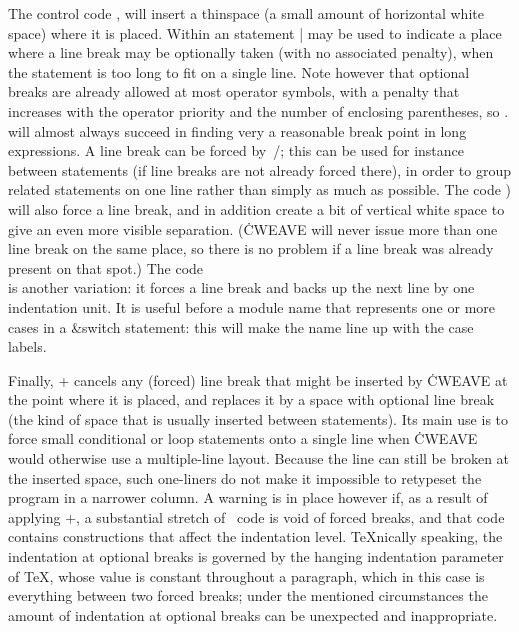 The control code \:, will insert a thinspace (a small amount of horizontal
white space) where it is placed. Within an statement \:| may be used to
indicate a place where a line break may be optionally taken (with no
associated penalty), when the statement is too long to fit on a single line.
Note however that optional breaks are already allowed at most operator
symbols, with a penalty that increases with the operator priority and the
number of enclosing parentheses, so \CWEB. will almost always succeed in
finding very a reasonable break point in long expressions. A line break can
be forced by~\:/; this can be used for instance between statements (if line
breaks are not already forced there), in order to group related statements
on one line rather than simply as much as possible. The code \:) will also
force a line break, and in addition create a bit of vertical white space to
give an even more visible separation. (\.{CWEAVE} will never issue more than
one line break on the same place, so there is no problem if a line break was
already present on that spot.) The code \:\\ is another variation: it forces
a line break and backs up the next line by one indentation unit. It is
useful before a module name that represents one or more cases in a
\&{switch} statement: this will make the name line up with the case labels.

Finally, \:+ cancels any (forced) line break that might be inserted by
\.{CWEAVE} at the point where it is placed, and replaces it by a space with
optional line break (the kind of space that is usually inserted between
statements). Its main use is to force small conditional or loop statements
onto a single line when \.{CWEAVE} would otherwise use a multiple-line
layout. Because the line can still be broken at the inserted space, such
one-liners do not make it impossible to retypeset the program in a narrower
column. A warning is in place however if, as a result of applying \:+, a
substantial stretch of \Cee~code is void of forced breaks, and that code
contains constructions that affect the indentation level. \TeX nically
speaking, the indentation at optional breaks is governed by the hanging
indentation parameter of \TeX, whose value is constant throughout a
paragraph, which in this case is everything between two forced breaks; under
the mentioned circumstances the amount of indentation at optional breaks can
be unexpected and inappropriate.


